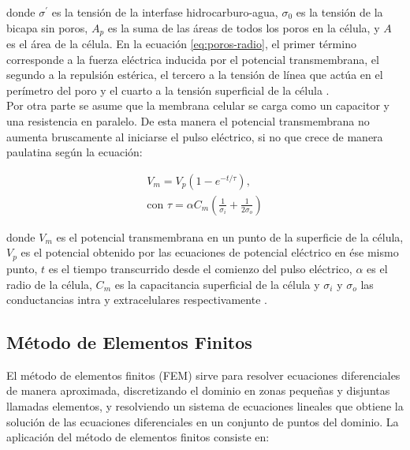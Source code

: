 \documentclass[a4paper,10pt]{article}
\begin{document}
donde $\sigma^\prime$ es la tensión de la interfase hidrocarburo-agua, $\sigma_0$ es la tensión de la bicapa sin poros, $A_p$ es la suma de las áreas de todos los poros en la célula, y $A$ es el área de la célula. En la ecuación \ref{eq:poros-radio}, el primer término corresponde a la fuerza eléctrica inducida por el potencial transmembrana, el segundo a la repulsión estérica, el tercero a la tensión de línea que actúa en el perímetro del poro y el cuarto a la tensión superficial de la célula \cite{krass}.\\

Por otra parte se asume que la membrana celular se carga como un capacitor y una resistencia en paralelo. De esta manera el potencial transmembrana no aumenta bruscamente al iniciarse el pulso eléctrico, si no que crece de manera paulatina según la ecuación: 

\begin{equation} \label{eq:capacit} \begin{split}
	V_m = V_p (1 - e^{-t/\tau}) , \\ \textrm{con } \tau = \alpha C_m \left( \frac{1}{\sigma_i} + \frac{1}{2 \sigma_o} \right)
\end{split} \end{equation}

donde $V_m$ es el potencial transmembrana en un punto de la superficie de la célula, $V_p$ es el potencial obtenido por las ecuaciones de potencial eléctrico en ése mismo punto, $t$ es el tiempo transcurrido desde el comienzo del pulso eléctrico, $\alpha$ es el radio de la célula, $C_m$ es la capacitancia superficial de la célula y $\sigma_i$ y $\sigma_o$ las conductancias intra y extracelulares respectivamente \cite{krass}.\\

\subsection{Método de Elementos Finitos}
El método de elementos finitos (FEM) sirve para resolver ecuaciones diferenciales de manera aproximada, discretizando el dominio en zonas pequeñas y disjuntas llamadas elementos, y resolviendo un sistema de ecuaciones lineales que obtiene la solución de las ecuaciones diferenciales en un conjunto de puntos del dominio. La aplicación del método de elementos finitos consiste en: \cite{fem}
\end{document}
